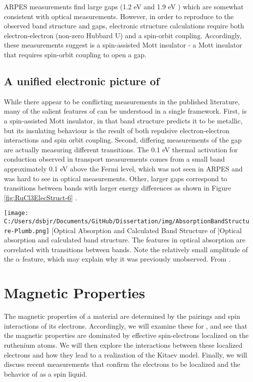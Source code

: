 ARPES measurements find large gaps (1.2 eV \cite{Zhou2016} and 1.9 eV \cite{Sinn2016}) which are somewhat consistent with optical measurements. However, in order to reproduce to the observed band structure and gaps, electronic structure calculations require both electron-electron (non-zero Hubbard U) and a spin-orbit coupling. Accordingly, these measurements suggest \rucl is a spin-assisted Mott insulator - a Mott insulator that requires spin-orbit coupling to open a gap.


\subsection{A unified electronic picture of \texorpdfstring{\rucl}{RuCl3}}
While there appear to be conflicting measurements in the published literature, many of the salient features of \rucl can be understood in a single framework. First, \rucl is a spin-assisted Mott insulator, in that band structure predicts it to be metallic, but its insulating behaviour is the result of both repulsive electron-electron interactions and spin orbit coupling. Second, differing measurements of the gap are actually measuring different transitions. The 0.1 eV thermal activation for conduction observed in transport measurements comes from a small band approximately 0.1 eV above the Fermi level, which was not seen in ARPES and was hard to see in optical measurements. Other, larger gaps correspond to transitions between bands with larger energy differences as shown in Figure \ref{fig:RuCl3ElecStruct-6} \cite{Plumb2014}.

\begin{centering}
\texttt{[image: C:/Users/dsbjr/Documents/GitHub/Dissertation/img/AbsorptionBandStructure-Plumb.png]}
  \captionsetup{width=0.75\textwidth}
  [Optical Absorption and Calculated Band Structure of \ruclnospace]{Optical absorption and calculated band structure. The features in optical absorption are correlated with transitions between bands. Note the relatively small amplitude of the $\alpha$ feature, which may explain why it was previously unobserved. From \cite{Plumb2014}}. 
  \label{fig:RuCl3ElecStruct-6}
\end{centering}

\section{Magnetic Properties}

The magnetic properties of a material are determined by the pairings and spin interactions of its electrons. Accordingly, we will examine these for \rucl, and see that the magnetic properties are dominated by effective spin-\textonehalf electrons localized on the ruthenium atoms. We will then explore the interactions between these localized electrons and how they lead to a realization of the Kitaev model. Finally, we will discuss recent measurements that confirm the electrons to be localized and the behavior of \rucl as a spin liquid.

